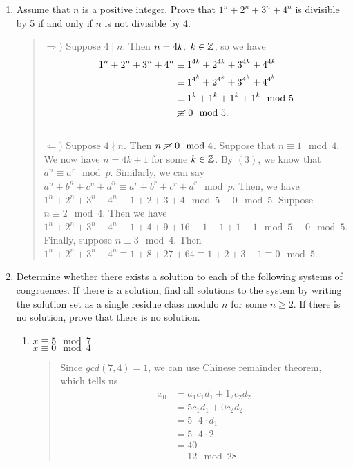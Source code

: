 \documentclass{hw}
\begin{document}
\begin{enumerate}
\item Assume that $n$ is a positive integer. Prove that $1^{n}+2^{n}+3^{n}+4^{n}$ is divisible by
5 if and only if $n$ is not divisible by 4.
\begin{quote}
$\Rightarrow)$ Suppose $4\mid n$. Then $n=4k,\ k\in\mathbb{Z}$, so we have
\begin{align*}
1^{n}+2^{n}+3^{n}+4^{n}&\equiv 1^{4k}+2^{4k}+3^{4k}+4^{4k}\\
&\equiv 1^{4^k}+2^{4^k}+3^{4^k}+4^{4^k}\\
&\equiv 1^k+1^k+1^k+1^k\mod5\\
&\ \cancel{\equiv}\ 0\mod5.
\end{align*}
\noindent\\
$\Leftarrow)$ Suppose $4\nmid n$. Then $n\ \cancel{\equiv}\ 0\mod4$. Suppose that $n\equiv1\mod4$.
We now have $n=4k+1$ for some $k\in\mathbb{Z}$. By $(3)$, we know that $a^{n}\equiv a^{r}\mod p$.
Similarly, we can say $a^{n} + b^{n} + c^{n} + d^{n}\equiv a^{r}+b^{r} + c^{r} + d^{r}\mod p$.
Then, we have $1^{n}+2^{n}+3^{n}+4^{n}\equiv 1 + 2 + 3 + 4\mod5\equiv0\mod5$. Suppose $n\equiv2\mod4$.
Then we have $1^{n}+2^{n}+3^{n}+4^{n}\equiv 1 + 4 + 9 + 16\equiv1-1+1-1\mod5\equiv0\mod5$. Finally,
suppose $n\equiv3\mod4$. Then $1^{n}+2^{n}+3^{n}+4^{n}\equiv1+8+27+64\equiv1+2+3-1\equiv0\mod5$.
\end{quote}

\item Determine whether there exists a solution to each of the following systems of congruences.  If
there is a solution, find all solutions to the system by writing the solution set as a single residue
class modulo $n$ for some $n\geq 2$. If there is no solution, prove that there is no solution.
\begin{enumerate}
\item $x\equiv5\mod7$\\
$x\equiv0\mod4$
\begin{quote}
Since $gcd(7,4)=1$, we can use Chinese remainder theorem, which tells us
\begin{align*}
x_{0}&=a_{1}c_{1}d_{1}+1_{2}c_{2}d_{2}\\
&= 5c_{1}d_{1} + 0c_{2}d_{2}\\
&= 5\cdot4\cdot d_{1}\\
&= 5\cdot4\cdot2\\
&= 40\\
&\equiv 12\mod28
\end{align*}
\end{quote}


\end{enumerate}
\end{enumerate}
\end{document}
